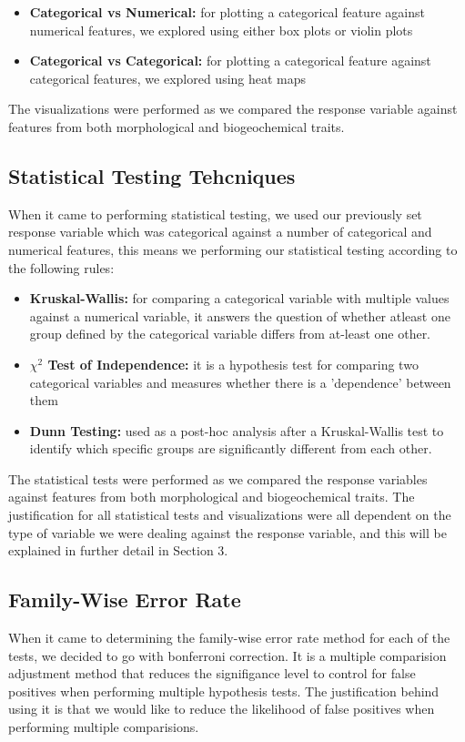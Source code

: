 \documentclass[a4paper]{article}
\begin{document}
\begin{itemize}
    \item \textbf{Categorical vs Numerical:} for plotting a categorical feature against numerical features, we explored using either box plots or violin plots
    \item \textbf{Categorical vs Categorical:} for plotting a categorical feature against categorical features, we explored using heat maps
\end{itemize}

\noindent The visualizations were performed as we compared the response variable against features from both morphological and biogeochemical traits.

\subsection{Statistical Testing Tehcniques}
When it came to performing statistical testing, we used our previously set response variable which was categorical against a number of categorical and
numerical features, this means we performing our statistical testing according to the following rules:

\begin{itemize}
    \item \textbf{Kruskal-Wallis:} for comparing a categorical variable with multiple values against a numerical variable, it answers the question of whether
    atleast one group defined by the categorical variable differs from at-least one other.
    \item \textbf{$\chi^2$ Test of Independence:} it is a hypothesis test for comparing two categorical variables and measures whether there is a 'dependence' 
    between them
    \item \textbf{Dunn Testing:} used as a post-hoc analysis after a Kruskal-Wallis test to identify which specific groups are significantly different from
    each other.
\end{itemize}

\noindent The statistical tests were performed as we compared the response variables against features from both morphological and biogeochemical traits. The 
justification for all statistical tests and visualizations were all dependent on the type of variable we were dealing against the response variable, and this
will be explained in further detail in Section 3.

\subsection{Family-Wise Error Rate}
When it came to determining the family-wise error rate method for each of the tests, we decided to go with bonferroni correction. It is a multiple comparision
adjustment method that reduces the signifigance level to control for false positives when performing multiple hypothesis tests. The justification behind using
it is that we would like to reduce the likelihood of false positives when performing multiple comparisions. 
\end{document}

